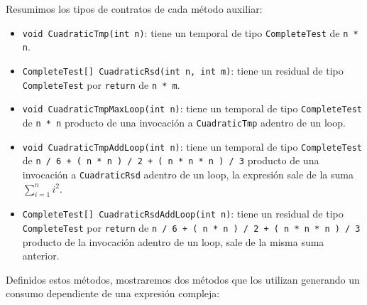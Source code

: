 \documentclass[12pt,a4paper]{article}
\newcommand\mono[1]{\texttt{#1}}
\begin{document}
			Resumimos los tipos de contratos de cada método auxiliar:

			\begin{itemize}
				\item \mono{void CuadraticTmp(int n)}: tiene un temporal de tipo \mono{CompleteTest} de \mono{n * n}.
				\item \mono{CompleteTest[] CuadraticRsd(int n, int m)}: tiene un residual de tipo \\ \mono{CompleteTest} por \mono{return} de \mono{n * m}.
				\item \mono{void CuadraticTmpMaxLoop(int n)}: tiene un temporal de tipo \mono{CompleteTest} de \mono{n * n} producto de una invocación a \mono{CuadraticTmp} adentro de un loop.
				\item \mono{void CuadraticTmpAddLoop(int n)}: tiene un temporal de tipo \mono{CompleteTest} de \mono{n / 6 + ( n * n ) / 2 + ( n * n * n ) / 3} producto de una invocación a \mono{CuadraticRsd} adentro de un loop, la expresión sale de la suma $\sum_{i = 1}^n i^2$.
				\item \mono{CompleteTest[] CuadraticRsdAddLoop(int n)}: tiene un residual de tipo \\ \mono{CompleteTest} por \mono{return} de \mono{n / 6 + ( n * n ) / 2 + ( n * n * n ) / 3} producto de la invocación adentro de un loop, sale de la misma suma anterior.
			\end{itemize}

			Definidos estos métodos, mostraremos dos métodos que los utilizan generando un consumo dependiente de una expresión compleja:
\end{document}
